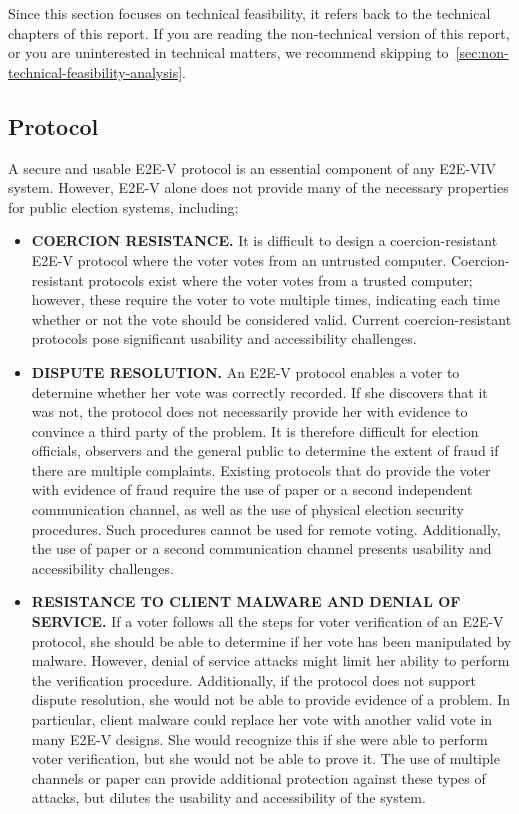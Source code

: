 Since this section focuses on technical feasibility, it refers back to
the technical chapters of this report.  If you are reading the
non-technical version of this report, or you are uninterested in
technical matters, we recommend skipping
to~\autoref{sec:non-technical-feasibility-analysis}.

\subsection{Protocol}

A secure and usable E2E-V protocol is an essential component of any
E2E-VIV system. However, E2E-V alone does not provide many of the
necessary properties for public election systems, including:

\begin{itemize}
\item \textbf{COERCION RESISTANCE.} It is difficult to design a
  coercion-resistant E2E-V protocol where the voter votes from an
  untrusted computer. Coercion-resistant protocols exist where the
  voter votes from a trusted computer; however, these require the
  voter to vote multiple times, indicating each time whether or not
  the vote should be considered valid. Current coercion-resistant
  protocols pose significant usability and accessibility challenges.

\item \textbf{DISPUTE RESOLUTION.} An E2E-V protocol enables a voter
  to determine whether her vote was correctly recorded. If she
  discovers that it was not, the protocol does not necessarily provide
  her with evidence to convince a third party of the problem. It is
  therefore difficult for election officials, observers and the
  general public to determine the extent of fraud if there are
  multiple complaints. Existing protocols that do provide the voter
  with evidence of fraud require the use of paper or a second
  independent communication channel, as well as the use of physical
  election security procedures. Such procedures cannot be used for
  remote voting. Additionally, the use of paper or a second
  communication channel presents usability and accessibility
  challenges.

\item \textbf{RESISTANCE TO CLIENT MALWARE AND DENIAL OF SERVICE.} If
  a voter follows all the steps for voter verification of an E2E-V
  protocol, she should be able to determine if her vote has been
  manipulated by malware. However, denial of service attacks might
  limit her ability to perform the verification
  procedure. Additionally, if the protocol does not support dispute
  resolution, she would not be able to provide evidence of a
  problem. In particular, client malware could replace her vote with
  another valid vote in many E2E-V designs. She would recognize this
  if she were able to perform voter verification, but she would not be
  able to prove it. The use of multiple channels or paper can provide
  additional protection against these types of attacks, but dilutes the
  usability and accessibility of the system.


\end{itemize}
